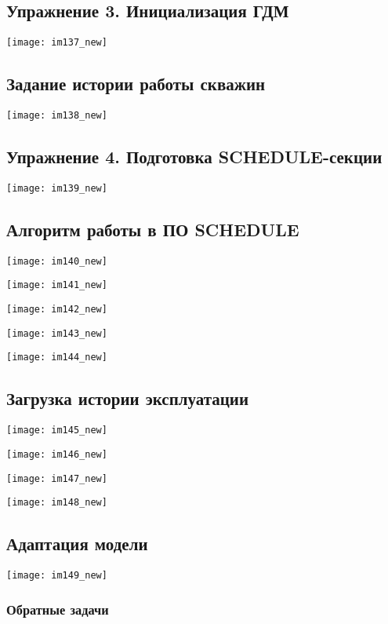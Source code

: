 \documentclass[main.tex]{subfiles}
\begin{document}
\subsection{Упражнение 3. Инициализация ГДМ}

\texttt{[image: im137\_new]}

\subsection{Задание истории работы скважин}

\texttt{[image: im138\_new]}

\subsection{Упражнение 4. Подготовка SCHEDULE-секции}

\texttt{[image: im139\_new]}

\subsection{Алгоритм работы в ПО SCHEDULE}

\texttt{[image: im140\_new]}

\texttt{[image: im141\_new]}

\texttt{[image: im142\_new]}

\texttt{[image: im143\_new]}

\texttt{[image: im144\_new]}

\subsection{Загрузка истории эксплуатации}

\texttt{[image: im145\_new]}

\texttt{[image: im146\_new]}

\texttt{[image: im147\_new]}

\texttt{[image: im148\_new]}

\subsection{Адаптация модели}

\texttt{[image: im149\_new]}

\subsubsection{Обратные задачи}
\end{document}
